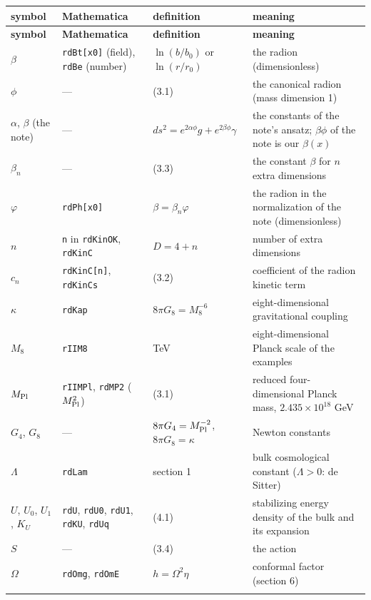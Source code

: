\documentclass[10pt,a4paper]{article}
\begin{document}
{\footnotesize
\begin{longtable}{>{\raggedright\arraybackslash}p{}>{\raggedright\arraybackslash}p{}>{\raggedright\arraybackslash}p{}>{\raggedright\arraybackslash}p{}}
\toprule
\textbf{symbol} & \textbf{Mathematica} & \textbf{definition} & \textbf{meaning} \\
\midrule\endfirsthead
\toprule
\textbf{symbol} & \textbf{Mathematica} & \textbf{definition} & \textbf{meaning} \\
\midrule\endhead
\endfoot
\bottomrule\endlastfoot
$\beta$ & \texttt{rdBt[x0]} (field), \texttt{rdBe} (number) & $\ln(b/b_0)$ or $\ln(r/r_0)$ & the radion (dimensionless) \\
$\phi$ & — & (3.1) & the canonical radion (mass dimension 1) \\
$\alpha$, $\beta$ (the note) & — & $ds^2=e^{2\alpha\phi}g+e^{2\beta\phi}\gamma$ & the constants of the note’s ansatz; $\beta\phi$ of the note is our $\beta(x)$ \\
$\beta_n$ & — & (3.3) & the constant $\beta$ for $n$ extra dimensions \\
$\varphi$ & \texttt{rdPh[x0]} & $\beta=\beta_n\varphi$ & the radion in the normalization of the note (dimensionless) \\
$n$ & \texttt{n} in \texttt{rdKinOK}, \texttt{rdKinC} & $D=4+n$ & number of extra dimensions \\
$c_n$ & \texttt{rdKinC[n]}, \texttt{rdKinCs} & (3.2) & coefficient of the radion kinetic term \\
$\kappa$ & \texttt{rdKap} & $8\pi G_8=M_8^{-6}$ & eight-dimensional gravitational coupling \\
$M_8$ & \texttt{rIIM8} & 10 TeV & eight-dimensional Planck scale of the examples \\
$M_{\rm Pl}$ & \texttt{rIIMPl}, \texttt{rdMP2} ($M_{\rm Pl}^2$) & (3.1) & reduced four-dimensional Planck mass, $2.435\times10^{18}$ GeV \\
$G_4$, $G_8$ & — & $8\pi G_4=M_{\rm Pl}^{-2}$, $8\pi G_8=\kappa$ & Newton constants \\
$\Lambda$ & \texttt{rdLam} & section 1 & bulk cosmological constant ($\Lambda>0$: de Sitter) \\
$U$, $U_0$, $U_1$, $K_U$ & \texttt{rdU}, \texttt{rdU0}, \texttt{rdU1}, \texttt{rdKU}, \texttt{rdUq} & (4.1) & stabilizing energy density of the bulk and its expansion \\
$S$ & — & (3.4) & the action \\
$\Omega$ & \texttt{rdOmg}, \texttt{rdOmE} & $h=\Omega^2\eta$ & conformal factor (section 6) \\*
\end{longtable}}
\end{document}

